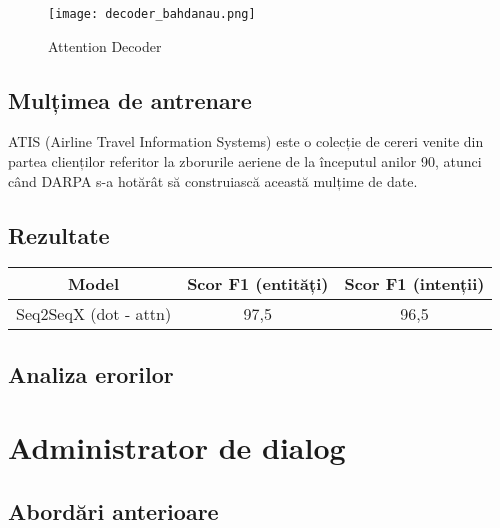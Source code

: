 \begin{figure}[h]
	\centering
	\texttt{[image: decoder\_bahdanau.png]}
	\caption{Attention Decoder}
	\label{fig:dec_bah}
\end{figure}

\subsection{Mulțimea de antrenare}
ATIS (Airline Travel Information Systems) \cite{atis_dataset} este o colecție de cereri venite din partea clienților referitor la zborurile aeriene de la începutul anilor 90, atunci când DARPA s-a hotărât să construiască această mulțime de date.


\subsection{Rezultate}

\begin{center}
	\begin{tabular}{ c c c } 
		\hline
		\textbf{Model} 		 & \textbf{Scor F1 (entități)} & \textbf{Scor F1 (intenții)}\\
		\hline
		Seq2SeqX (dot - attn) & 97,5 & 96,5 \\
		\hline
	\end{tabular}
\end{center}

\subsection{Analiza erorilor}




\section{Administrator de dialog}

\subsection{Abordări anterioare}
